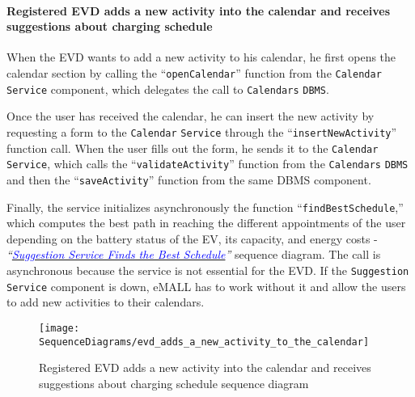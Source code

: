 \paragraph{Registered EVD adds a new activity into the calendar and receives suggestions about charging schedule}
When the EVD wants to add a new activity to his calendar, he first opens the calendar section by calling the ``\verb|openCalendar|'' function from the \verb|Calendar| \verb|Service| component, which delegates the call to \verb|Calendars| \verb|DBMS|\@.

Once the user has received the calendar, he can insert the new activity by requesting a form to the \verb|Calendar| \verb|Service| through the ``\verb|insertNewActivity|'' function call.
When the user fills out the form, he sends it to the \verb|Calendar| \verb|Service|, which calls the ``\verb|validateActivity|'' function from the \verb|Calendars| \verb|DBMS| and then the ``\verb|saveActivity|'' function from the same DBMS component.

Finally, the service initializes asynchronously the function ``\verb|findBestSchedule|,'' which computes the best path in reaching the different appointments of the user depending on the battery status of the EV, its capacity, and energy costs - \textit{``}\hyperlink{suggestionfindsschedule}{\textcolor{blue}{\textit{Suggestion Service Finds the Best Schedule}}}\textit{''} sequence diagram.
The call is asynchronous because the service is not essential for the EVD\@.
If the \verb|Suggestion| \verb|Service| component is down, eMALL has to work without it and allow the users to add new activities to their calendars.
\begin{figure}[H]
    \begin{center}
        \texttt{[image: SequenceDiagrams/evd\_adds\_a\_new\_activity\_to\_the\_calendar]}
        \caption{Registered EVD adds a new activity into the calendar and receives suggestions about charging schedule sequence diagram}
        \label{fig:evd_adds_new_activity_calendar}
    \end{center}
\end{figure}

